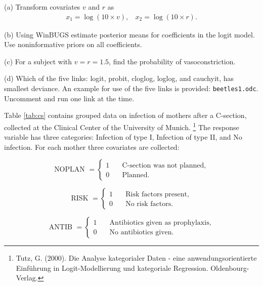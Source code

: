 \documentclass[12pt]{article}
\newcommand{\ba}{\begin{eqnarray*}}
\newcommand{\ea}{\end{eqnarray*}}
\begin{document}
(a) Transform covariates $v$ and $r$ as
\ba
x_1 = \log(10 \times v),~~~~x_2 = \log(10 \times r).
\ea

(b) Using WinBUGS estimate posterior
 means for coefficients in the logit model.
 Use noninformative priors on all coefficients.


(c) For a subject with $v=r=1.5$, find the probability of
  vasoconstriction.


(d) Which of the five links: logit, probit, cloglog, loglog, and cauchyit,
has smallest deviance. An example for use of the five links is
provided: {\tt beetles1.odc}. Uncomment and run one link at the time.





\vspace{0.3in}

Table \ref{tab:cs} contains grouped data on infection of mothers after a C-section, collected at the
Clinical Center of the University of Munich.
\footnote{Tutz, G. (2000). Die Analyse kategorialer Daten - eine anwendungsorientierte Einführung in Logit-Modellierung und kategoriale Regression. Oldenbourg-Verlag.}
The response variable has three categories: Infection of type I, Infection of type II, and No infection.
For each mother three covariates are collected:

$$ \mbox{NOPLAN }= \left\{ \begin{array}{ll} 1 & \mbox{{~~~}C-section was not planned,}\\
   0 & \mbox{{~~~}Planned.} \end{array}\right. $$


$$ \mbox{RISK }= \left\{ \begin{array}{ll} 1 & \mbox{{~~~}Risk factors present,}\\
   0 & \mbox{{~~~}No risk factors.} \end{array}\right. $$


$$ \mbox{ANTIB }= \left\{ \begin{array}{ll} 1 & \mbox{{~~~}Antibiotics given as prophylaxis,}\\
   0 & \mbox{{~~~}No antibiotics given.} \end{array}\right. $$
\end{document}
